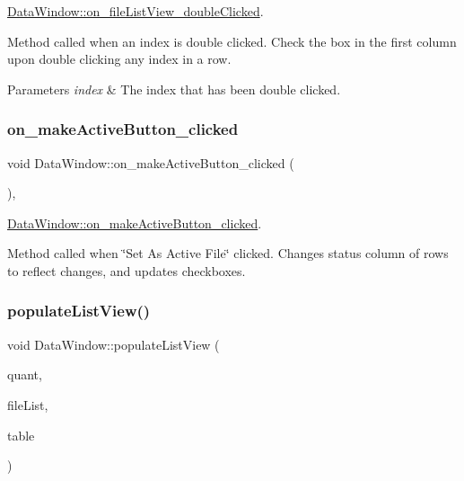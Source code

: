 \hyperlink{class_data_window_a23c96a1aa6f3c58cc8cc1eb9fe0535a7}{Data\+Window\+::on\+\_\+file\+List\+View\+\_\+double\+Clicked}. 

Method called when an index is double clicked. Check the box in the first column upon double clicking any index in a row. 
\begin{DoxyParams}{Parameters}
{\em index} & The index that has been double clicked. \\
\hline
\end{DoxyParams}
\mbox{\label{class_data_window_a5ea68a603e92668ccb96b4d2375ce482}} 
\subsubsection{\texorpdfstring{on\+\_\+make\+Active\+Button\+\_\+clicked}{on\_makeActiveButton\_clicked}}
{\footnotesize\ttfamily void Data\+Window\+::on\+\_\+make\+Active\+Button\+\_\+clicked (\begin{DoxyParamCaption}{ }\end{DoxyParamCaption})\hspace{0.3cm}{\ttfamily [private]}, {\ttfamily [slot]}}



\hyperlink{class_data_window_a5ea68a603e92668ccb96b4d2375ce482}{Data\+Window\+::on\+\_\+make\+Active\+Button\+\_\+clicked}. 

Method called when \char`\"{}\+Set As Active File\char`\"{} clicked. Changes status column of rows to reflect changes, and updates checkboxes. \mbox{\label{class_data_window_a05f37e2adbb1f1d530b636065fe84a30}} 
\subsubsection{\texorpdfstring{populate\+List\+View()}{populateListView()}}
{\footnotesize\ttfamily void Data\+Window\+::populate\+List\+View (\begin{DoxyParamCaption}\item[{int}]{quant,  }\item[{Q\+String\+List}]{file\+List,  }\item[{Q\+Table\+View $\ast$}]{table }\end{DoxyParamCaption})\hspace{0.3cm}{\ttfamily [private]}}



